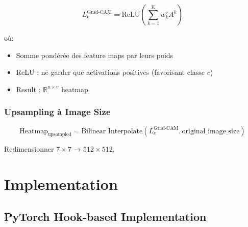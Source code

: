 \documentclass[12pt,a4paper,oneside]{report}
\begin{document}
\begin{equation}
L_c^{\text{Grad-CAM}} = \text{ReLU}
\left( \sum_{k=1}^{K} w_k^c A^k \right)
\label{eq:gradcam_heatmap}
\end{equation}

où:
\begin{itemize}
    \item Somme pondérée des feature maps par leurs poids
    \item ReLU : ne garder que activations positives 
          (favorisant classe $c$)
    \item Result : $ \mathbb{R}^{u \times v}$ heatmap
\end{itemize}

\subsubsection{Upsampling à Image Size}

\begin{equation}
\text{Heatmap}_{\text{upsampled}} = 
\text{Bilinear Interpolate}(L_c^{\text{Grad-CAM}}, 
\text{original\_image\_size})
\end{equation}

Redimensionner $7 \times 7$ → $512 \times 512$.

\section{Implementation}

\subsection{PyTorch Hook-based Implementation}
\end{document}
